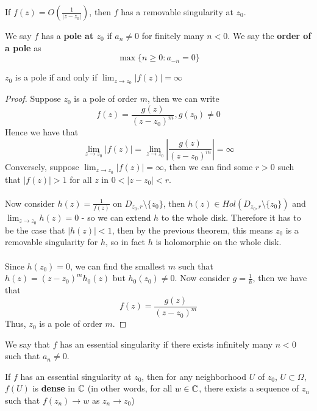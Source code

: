\documentclass{article}
\begin{document}
\begin{remark}
If $f(z) = O(\frac{1}{|z - z_0|})$, then $f$ has a removable singularity at $z_0$.
\end{remark}

We say $f$ has a \textbf{pole at $z_0$} if $a_n \neq 0$ for finitely many $n < 0$. We say the \textbf{order of a pole} as
        \[\max \{n \geq 0: a_{-n} = 0\}\]
        
\begin{theorem}
$z_0$ is a pole if and only if $\lim_{z \to z_0} |f(z)| = \infty$
\end{theorem}

\begin{proof}
Suppose $z_0$ is a pole of order $m$, then we can write
\[f(z) = \frac{g(z)}{(z - z_0)^m}, g(z_0) \neq 0\]
Hence we have that
\[\lim_{z \to z_0} |f(z)| = \lim_{z \to z_0} |\frac{g(z)}{(z - z_0)^m}| = \infty\]
Conversely, suppose $\lim_{z \to z_0} |f(z)| = \infty$, then we can find some $r > 0$ such that $|f(z)| > 1$ for all $z$ in $0 < |z - z_0| < r$.\\\\
Now consider $h(z) = \frac{1}{f(z)}$ on $D_{z_0, r} \setminus \{z_0\}$, then $h(z) \in Hol(D_{z_0, r} \setminus \{z_0\})$ and $\lim_{z \to z_0} h(z) = 0$ - so we can extend $h$ to the whole disk. Therefore it has to be the case that $|h(z)| < 1$, then by the previous theorem, this means $z_0$ is a removable singularity for $h$, so in fact $h$ is holomorphic on the whole disk.\\\\
Since $h(z_0) = 0$, we can find the smallest $m$ such that $h(z) = (z - z_0)^m h_0(z)$ but $h_0(z_0) \neq 0$. Now consider $g = \frac{1}{h}$, then we have that
\[f(z) = \frac{g(z)}{(z - z_0)^m}\]
Thus, $z_0$ is a pole of order $m$.
\end{proof}

We say that $f$ has an essential singularity if there exists infinitely many $n < 0$ such that $a_n \neq 0$.

\begin{theorem}
If $f$ has an essential singularity at $z_0$, then for any neighborhood $U$ of $z_0$, $U \subset \Omega$, $f(U)$ is \textbf{dense} in $\mathbb{C}$ (in other words, for all $w \in \mathbb{C}$, there exists a sequence of $z_n$ such that $f(z_n) \to w$ as $z_n \to z_0$)
\end{theorem}
\end{document}

